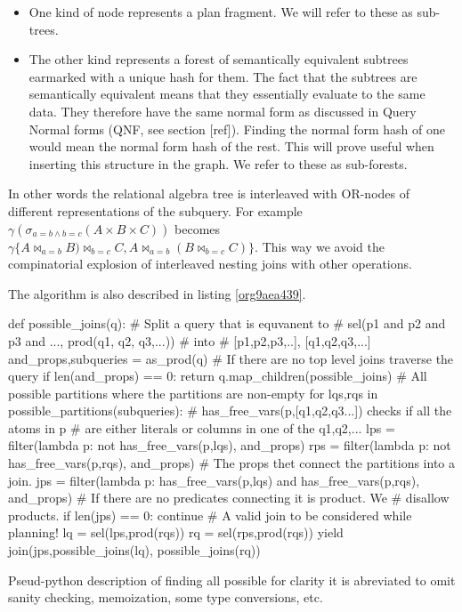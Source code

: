 \begin{itemize}
\item One kind of node represents a plan fragment. We will refer to
  these as sub-trees.
\item The other kind represents a forest of semantically equivalent
  subtrees earmarked with a unique hash for them. The fact that the
  subtrees are semantically equivalent means that they essentially
  evaluate to the same data. They therefore have the same normal form
  as discussed in Query Normal forms (QNF, see section [ref]). Finding
  the normal form hash of one would mean the normal form hash of the
  rest. This will prove useful when inserting this structure in the
  graph. We refer to these as sub-forests.
\end{itemize}

In other words the relational algebra tree is interleaved with
OR-nodes of different representations of the subquery. For example
\(\gamma(\sigma_{a=b \land b=c}(A \times B \times C))\) becomes
\(\gamma\{A \Join_{a=b} B) \Join_{b=c} C, A \Join_{a=b} (B \Join_{b=c}
C)\}\). This way we avoid the compinatorial explosion of interleaved
nesting joins with other operations.

The algorithm is also described in listing \ref{org9aea439}.

\begin{code}
  \begin{pycode}
    def possible_joins(q):
        # Split a query that is equvanent to
        # sel(p1 and p2 and p3 and ..., prod(q1, q2, q3,...))
        # into
        # [p1,p2,p3,..], [q1,q2,q3,...]
        and_props,subqueries =  as_prod(q)
        # If there are no top level joins traverse the query
        if len(and_props) == 0:
            return q.map_children(possible_joins)
        # All possible partitions where the partitions are non-empty
        for lqs,rqs in possible_partitions(subqueries):
            # has_free_vars(p,[q1,q2,q3...]) checks if all the atoms in p
            # are either literals or columns in one of the q1,q2,...
            lps = filter(lambda p: not has_free_vars(p,lqs), and_props)
            rps = filter(lambda p: not has_free_vars(p,rqs), and_props)
            # The props thet connect the partitions into a join.
            jps = filter(lambda p: has_free_vars(p,lqs)
                         and has_free_vars(p,rqs),
                         and_props)
            # If there are no predicates connecting it is product. We
            # disallow products.
            if len(jps) == 0: continue
            # A valid join to be considered while planning!
            lq = sel(lps,prod(rqs))
            rq = sel(rps,prod(rqs))
            yield join(jps,possible_joins(lq), possible_joins(rq))
  \end{pycode}
  \caption{\label{org9aea439}Pseud-python description of finding all
    possible for clarity it is abreviated to omit sanity checking,
    memoization, some type conversions, etc.}
\end{code}

